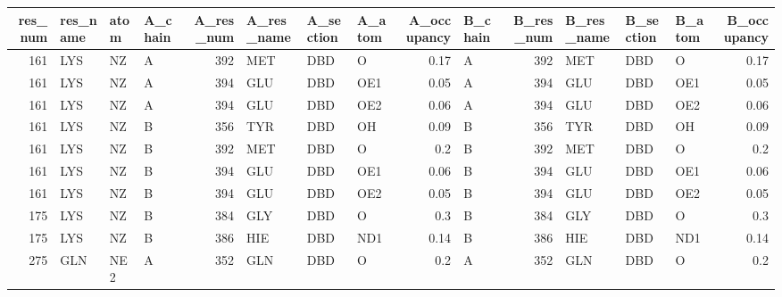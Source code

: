 \begin{longtable}{rlllrlllrlrlllr}
\hline
   res\_num & res\_name   & atom   & A\_chain   &   A\_res\_num & A\_res\_name   & A\_section   & A\_atom   &   A\_occupancy & B\_chain   &   B\_res\_num & B\_res\_name   & B\_section   & B\_atom   &   B\_occupancy \\
\hline
\endhead
       161 & LYS        & NZ     & A         &         392 & MET          & DBD         & O        &          0.17 & A         &         392 & MET          & DBD         & O        &          0.17 \\
       161 & LYS        & NZ     & A         &         394 & GLU          & DBD         & OE1      &          0.05 & A         &         394 & GLU          & DBD         & OE1      &          0.05 \\
       161 & LYS        & NZ     & A         &         394 & GLU          & DBD         & OE2      &          0.06 & A         &         394 & GLU          & DBD         & OE2      &          0.06 \\
       161 & LYS        & NZ     & B         &         356 & TYR          & DBD         & OH       &          0.09 & B         &         356 & TYR          & DBD         & OH       &          0.09 \\
       161 & LYS        & NZ     & B         &         392 & MET          & DBD         & O        &          0.2  & B         &         392 & MET          & DBD         & O        &          0.2  \\
       161 & LYS        & NZ     & B         &         394 & GLU          & DBD         & OE1      &          0.06 & B         &         394 & GLU          & DBD         & OE1      &          0.06 \\
       161 & LYS        & NZ     & B         &         394 & GLU          & DBD         & OE2      &          0.05 & B         &         394 & GLU          & DBD         & OE2      &          0.05 \\
       175 & LYS        & NZ     & B         &         384 & GLY          & DBD         & O        &          0.3  & B         &         384 & GLY          & DBD         & O        &          0.3  \\
       175 & LYS        & NZ     & B         &         386 & HIE          & DBD         & ND1      &          0.14 & B         &         386 & HIE          & DBD         & ND1      &          0.14 \\
       275 & GLN        & NE2    & A         &         352 & GLN          & DBD         & O        &          0.2  & A         &         352 & GLN          & DBD         & O        &          0.2  \\

\end{longtable}
